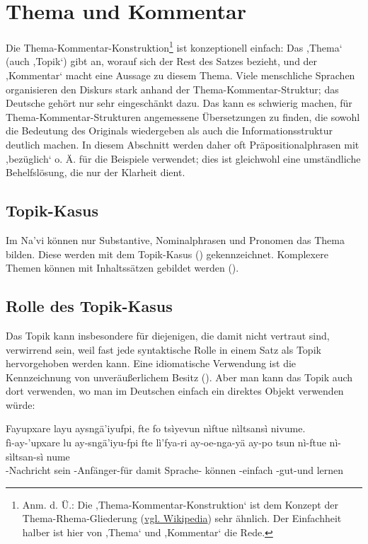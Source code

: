 
\section{Thema und Kommentar}
\label{pragma:topic-comment}

\noindent Die Thema-Kommentar-Konstruktion\footnote{Anm. d. Ü.: Die ,Thema-Kommentar-Konstruktion‘ ist dem Konzept der Thema-Rhema-Gliederung (\href{https://de.wikipedia.org/wiki/Thema-Rhema-Gliederung}{vgl. Wikipedia}) sehr ähnlich. Der Einfachheit halber ist hier von ,Thema‘ und ,Kommentar‘ die Rede.} ist konzeptionell einfach: Das ,Thema‘ (auch ,Topik‘) gibt an, worauf sich der Rest des Satzes bezieht, und der ,Kommentar‘ macht eine Aussage zu diesem Thema. Viele menschliche Sprachen organisieren den Diskurs stark anhand der Thema-Kommentar-Struktur; das Deutsche gehört nur sehr eingeschänkt dazu. Das kann es schwierig machen, für Thema-Kommentar-Strukturen angemessene Übersetzungen zu finden, die sowohl die Bedeutung des Originals wiedergeben als auch die Informationsstruktur deutlich machen. In diesem Abschnitt werden daher oft Präpositionalphrasen mit ,bezüglich‘ o. Ä. für die Beispiele verwendet; dies ist gleichwohl eine umständliche Behelfslösung, die nur der Klarheit dient.

\subsection{Topik-Kasus} Im Na'vi können nur Substantive, Nominalphrasen und Pronomen das Thema bilden. Diese werden mit dem Topik-Kasus () gekennzeichnet. Komplexere Themen können mit Inhaltssätzen gebildet werden ().

\subsection{Rolle des Topik-Kasus} \label{pragma:topical-role}
Das Topik kann insbesondere für diejenigen, die damit nicht vertraut sind, verwirrend sein, weil fast jede syntaktische Rolle in einem Satz als Topik hervorgehoben werden kann. Eine idiomatische Verwendung ist die Kennzeichnung von unveräußerlichem Besitz (). Aber man kann das Topik auch dort verwenden, wo man im Deutschen einfach ein direktes Objekt verwenden würde:

\begin{interlin}
	\glll \Npawl{}Fayupxare layu aysngä’iyufpi, fte   fo tsìyevun nìftue nìltsansì nivume. \\
	fì-ay-'upxare lu ay-sngä'iyu-fpi fte lì'fya-ri ay-oe-nga-yä ay-po tsun nì-ftue nì-sìltsan-sì nume \\
	-Nachricht sein -Anfänger-für damit Sprache-   können -einfach -gut-und lernen \\
\end{interlin}

